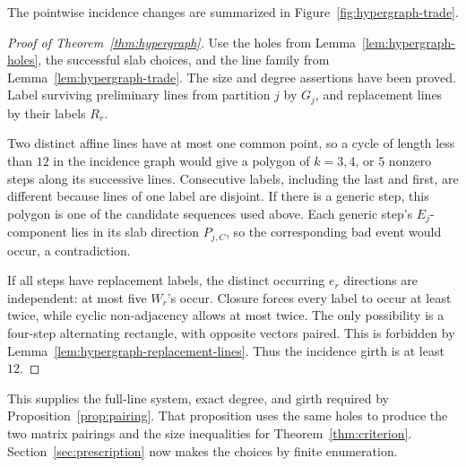 The pointwise incidence changes are summarized in
Figure~\ref{fig:hypergraph-trade}.

\begin{proof}[Proof of Theorem~\ref{thm:hypergraph}]
Use the holes from Lemma~\ref{lem:hypergraph-holes}, the successful
slab choices, and the line family from Lemma~\ref{lem:hypergraph-trade}.
The size and degree assertions have been proved.  Label surviving
preliminary lines from partition $j$ by $G_j$, and replacement lines
by their labels $R_r$.

Two distinct affine lines have at most one common point, so a cycle
of length less than $12$ in the incidence graph would give a polygon
of $k=3,4$, or $5$ nonzero steps along its successive lines.
Consecutive labels, including the last and first, are different
because lines of one label are disjoint.  If there is a generic step,
this polygon is one of the candidate sequences used above.  Each
generic step's $E_j$-component lies in its slab direction $P_{j,C}$,
so the corresponding bad event would occur, a contradiction.

If all steps have replacement labels, the distinct occurring $e_r$
directions are independent: at most five $W_r$'s occur.
Closure forces every label to occur at least twice, while cyclic
non-adjacency allows at most twice.  The only possibility is a
four-step alternating rectangle, with opposite vectors paired.
This is forbidden by Lemma~\ref{lem:hypergraph-replacement-lines}.
Thus the incidence girth is at least $12$.
\end{proof}

This supplies the full-line system, exact degree, and girth required by
Proposition~\ref{prop:pairing}. That proposition uses the same holes to
produce the two matrix pairings and the size inequalities for
Theorem~\ref{thm:criterion}. Section~\ref{sec:prescription} now makes the
choices by finite enumeration.
